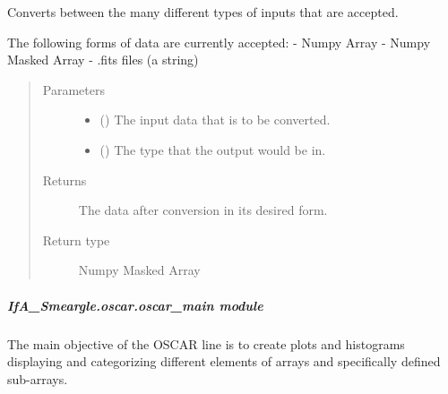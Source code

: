 \documentclass[letterpaper,10pt,english]{sphinxmanual}
\begin{document}

\begin{fulllineitems}
\label{\detokenize{python_docstrings/IfA_Smeargle.oscar.oscar_functions:IfA_Smeargle.oscar.oscar_functions.oscar_convert_data_inputs}}
Converts between the many different types of inputs that are accepted.

The following forms of data are currently accepted:
- Numpy Array
- Numpy Masked Array
- .fits files (a string)
\begin{quote}\begin{description}
\item[{Parameters}] \leavevmode\begin{itemize}
\item {} 
 () \textendash{} The input data that is to be converted.

\item {} 
 () \textendash{} The type that the output would be in.

\end{itemize}

\item[{Returns}] \leavevmode
{} \textendash{} The data after conversion in its desired form.

\item[{Return type}] \leavevmode
Numpy Masked Array

\end{description}\end{quote}

\end{fulllineitems}



\subparagraph{IfA\_Smeargle.oscar.oscar\_main module}
\label{\detokenize{python_docstrings/IfA_Smeargle.oscar.oscar_main:module-IfA_Smeargle.oscar.oscar_main}}\label{\detokenize{python_docstrings/IfA_Smeargle.oscar.oscar_main:ifa-smeargle-oscar-oscar-main-module}}\label{\detokenize{python_docstrings/IfA_Smeargle.oscar.oscar_main::doc}}
The main objective of the OSCAR line is to create plots and histograms displaying and
categorizing different elements of arrays and specifically defined sub-arrays.
\end{document}
